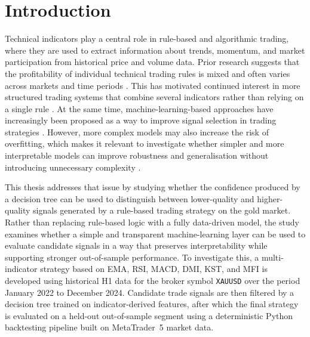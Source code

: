\chapter{Introduction}
\label{chapter:Introduction}

\setcounter{page}{1} %
\pagestyle{plain}







Technical indicators play a central role in rule-based and algorithmic trading, where they are used to extract information about trends, momentum, and market participation from historical price and volume data. Prior research suggests that the profitability of individual technical trading rules is mixed and often varies across markets and time periods \citep{lento2007profitability}. This has motivated
continued interest in more structured trading systems that combine several
indicators rather than relying on a single rule
\citep{keshavarz2022trading}. At the same time, machine-learning-based
approaches have increasingly been proposed as a way to improve signal
selection in trading strategies \citep{sukma2025enhancing}. However, more complex models may also increase the risk of overfitting, which makes it relevant to investigate whether simpler and more interpretable models can improve robustness and generalisation without introducing unnecessary complexity
\citep{dietterich1995overfitting}.

This thesis addresses that issue by studying whether the confidence produced by
a decision tree can be used to distinguish between lower-quality and
higher-quality signals generated by a rule-based trading strategy on the gold
market. Rather than replacing rule-based logic with a fully data-driven model,
the study examines whether a simple and transparent machine-learning layer can
be used to evaluate candidate signals in a way that preserves interpretability
while supporting stronger out-of-sample performance. To investigate this, a
multi-indicator strategy based on EMA, RSI, MACD, DMI, KST, and MFI is
developed using historical H1 data for the broker symbol \texttt{XAUUSD} over
the period January 2022 to December 2024. Candidate trade signals are then
filtered by a decision tree trained on indicator-derived features, after which
the final strategy is evaluated on a held-out out-of-sample segment using a
deterministic Python backtesting pipeline built on MetaTrader~5 market data.


